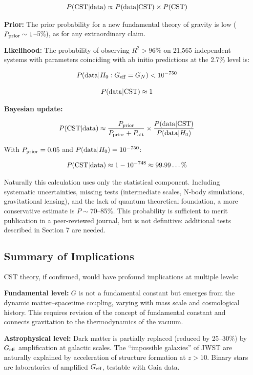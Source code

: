 \documentclass[11pt,a4paper]{article}
\begin{document}
\[P({\rm CST}|{\rm data}) \propto P({\rm data}|{\rm CST}) \times P({\rm CST})\]

\textbf{Prior:} The prior probability for a new fundamental theory of
gravity is low (\(P_{\rm prior} \sim 1\)--5\%), as for any extraordinary
claim.

\textbf{Likelihood:} The probability of observing \(R^2 > 96\%\) on
21,565 independent systems with parameters coinciding with ab initio
predictions at the 2.7\% level is:

\[P({\rm data}|H_0: G_{\rm eff}=G_N) < 10^{-750}\]

\[P({\rm data}|{\rm CST}) \approx 1\]

\textbf{Bayesian update:}

\[P({\rm CST}|{\rm data}) \approx \frac{P_{\rm prior}}{P_{\rm prior} + P_{\rm alt}} \times \frac{P({\rm data}|{\rm CST})}{P({\rm data}|H_0)}\]

With \(P_{\rm prior} = 0.05\) and \(P({\rm data}|H_0) = 10^{-750}\):

\[P({\rm CST}|{\rm data}) \approx 1 - 10^{-748} \approx 99.99\ldots\%\]

Naturally this calculation uses only the statistical component.
Including systematic uncertainties, missing tests (intermediate scales,
N-body simulations, gravitational lensing), and the lack of quantum
theoretical foundation, a more conservative estimate is
\(P \sim 70\)--85\%. This probability is sufficient to merit publication
in a peer-reviewed journal, but is not definitive: additional tests
described in Section 7 are needed.

\hypertarget{summary-of-implications}{%
\subsection{Summary of
Implications}\label{summary-of-implications}}

CST theory, if confirmed, would have profound implications at multiple
levels:

\textbf{Fundamental level:} \(G\) is not a fundamental constant but
emerges from the dynamic matter--spacetime coupling, varying with mass
scale and cosmological history. This requires revision of the concept of
fundamental constant and connects gravitation to the thermodynamics of
the vacuum.

\textbf{Astrophysical level:} Dark matter is partially replaced (reduced
by 25--30\%) by \(G_{\rm eff}\) amplification at galactic scales. The
``impossible galaxies'' of JWST are naturally explained by acceleration
of structure formation at \(z > 10\). Binary stars are laboratories of
amplified \(G_{\rm eff}\), testable with Gaia data.
\end{document}
